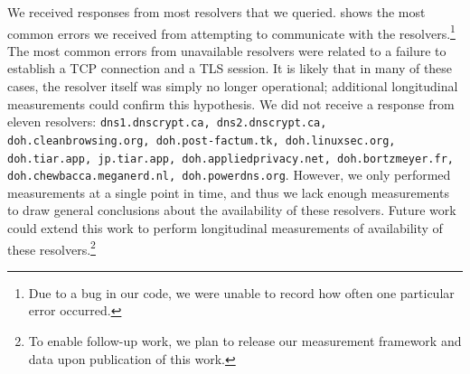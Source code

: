 We received responses from most resolvers that we queried.  
shows the most common errors we received from attempting to communicate with
the resolvers.\footnote{Due to a bug in our code, we were unable to record how 
often one particular error occurred.}
The most common errors from unavailable resolvers were related
to a failure to establish a TCP connection and a TLS session.  It is likely
that in many of these cases, the resolver itself was simply no longer
operational; additional longitudinal measurements could confirm this
hypothesis.  We did not receive a response from eleven resolvers:
\texttt{dns1.dnscrypt.ca, dns2.dnscrypt.ca, doh.cleanbrowsing.org,
doh.post-factum.tk, doh.linuxsec.org, doh.tiar.app, jp.tiar.app,
doh.appliedprivacy.net, doh.bortzmeyer.fr, doh.chewbacca.meganerd.nl,
doh.powerdns.org}. However, we only performed measurements at a single point
in time, and thus we lack enough measurements to draw general conclusions
about the availability of these resolvers. Future work could extend this work
to perform longitudinal measurements of availability of these
resolvers.\footnote{To
enable follow-up work, we plan to release our measurement framework and data upon
publication of this work.}


